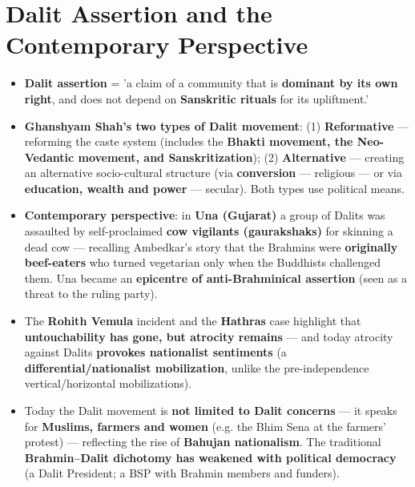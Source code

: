 \section{Dalit Assertion and the Contemporary Perspective}

\begin{KeyConcept}
\begin{itemize}
\item \textbf{Dalit assertion} = 'a claim of a community that is \textbf{dominant by its own right}, and does not depend on \textbf{Sanskritic rituals} for its upliftment.'
\item \textbf{Ghanshyam Shah's two types of Dalit movement}: (1) \textbf{Reformative} --- reforming the caste system (includes the \textbf{Bhakti movement, the Neo-Vedantic movement, and Sanskritization}); (2) \textbf{Alternative} --- creating an alternative socio-cultural structure (via \textbf{conversion} --- religious --- or via \textbf{education, wealth and power} --- secular). Both types use political means.
\item \textbf{Contemporary perspective}: in \textbf{Una (Gujarat)} a group of Dalits was assaulted by self-proclaimed \textbf{cow vigilants (gaurakshaks)} for skinning a dead cow --- recalling Ambedkar's story that the Brahmins were \textbf{originally beef-eaters} who turned vegetarian only when the Buddhists challenged them. Una became an \textbf{epicentre of anti-Brahminical assertion} (seen as a threat to the ruling party).
\item The \textbf{Rohith Vemula} incident and the \textbf{Hathras} case highlight that \textbf{untouchability has gone, but atrocity remains} --- and today atrocity against Dalits \textbf{provokes nationalist sentiments} (a \textbf{differential/nationalist mobilization}, unlike the pre-independence vertical/horizontal mobilizations).
\item Today the Dalit movement is \textbf{not limited to Dalit concerns} --- it speaks for \textbf{Muslims, farmers and women} (e.g. the Bhim Sena at the farmers' protest) --- reflecting the rise of \textbf{Bahujan nationalism}. The traditional \textbf{Brahmin--Dalit dichotomy has weakened with political democracy} (a Dalit President; a BSP with Brahmin members and funders).
\end{itemize}
\end{KeyConcept}

